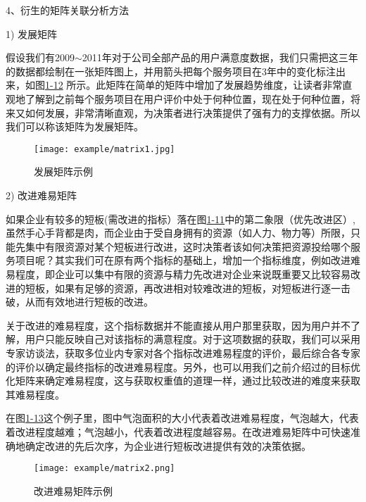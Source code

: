 4、衍生的矩阵关联分析方法

1) 发展矩阵

假设我们有2009$\sim$2011年对于公司全部产品的用户满意度数据，我们只需把这三年的数据都绘制在一张矩阵图上，并用箭头把每个服务项目在3年中的变化标注出来，如图\href{figure:1-12}{1-12} 所示。此矩阵在简单的矩阵中增加了发展趋势维度，让读者非常直观地了解到之前每个服务项目在用户评价中处于何种位置，现在处于何种位置，将来又如何发展，非常清晰直观，为决策者进行决策提供了强有力的支撑依据。所以我们可以称该矩阵为发展矩阵。

\begin{figure}[!htp]

\centering
\texttt{[image: example/matrix1.jpg]}
\caption{发展矩阵示例}
\label{figure:1-12}

\end{figure}

2) 改进难易矩阵

如果企业有较多的短板(需改进的指标）落在图\href{figure:1-11}{1-11}中的第二象限（优先改进区）,虽然手心手背都是肉，而企业由于受自身拥有的资源（如人力、物力等）所限，只能先集中有限资源对某个短板进行改进，这时决策者该如何决策把资源投给哪个服务项目呢？其实我们可在原有两个指标的基础上，增加一个指标维度，例如改进难易程度，即企业可以集中有限的资源与精力先改进对企业来说既重要又比较容易改进的短板，如果有足够的资源，再改进相对较难改进的短板，对短板进行逐一击破，从而有效地进行短板的改进。

关于改进的难易程度，这个指标数据并不能直接从用户那里获取，因为用户并不了解，用户只能反映自己对该指标的满意程度。对于这项数据的获取，我们可以采用专家访谈法，获取多位业内专家对各个指标改进难易程度的评价，最后综合各专家的评价以确定最终指标的改进难易程度。另外，也可以用我们之前介绍过的目标优化矩阵来确定难易程度，这与获取权重值的道理一样，通过比较改进的难度来获取其难易程度。

在图\href{figure:1-13}{1-13}这个例子里，图中气泡面积的大小代表着改进难易程度，气泡越大，代表着改进程度越难；气泡越小，代表着改进程度越容易。在改进难易矩阵中可快速准确地确定改进的先后次序，为企业进行短板改进提供有效的决策依据。

\begin{figure}[!htp]

\centering
\texttt{[image: example/matrix2.png]}
\caption{改进难易矩阵示例}
\label{figure:1-13}

\end{figure}

